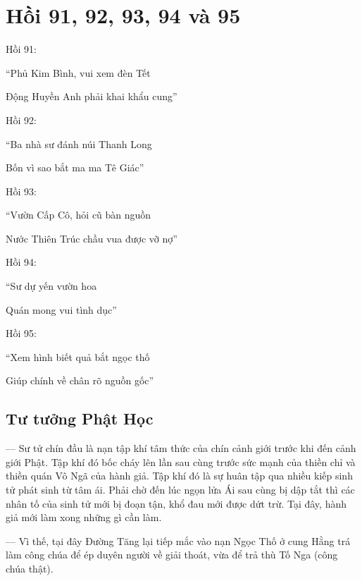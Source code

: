 \chapter{Hồi 91, 92, 93, 94 và 95} %
\label{cha:hoi_91_92_95}

Hồi 91:

\begin{itshape}
``Phủ Kim Bình, vui xem đèn Tết

Động Huyền Anh phải khai khẩu cung''
\end{itshape}

Hồi 92:

\begin{itshape}
``Ba nhà sư đánh núi Thanh Long

Bốn vì sao bắt ma ma Tê Giác''
\end{itshape}

Hồi 93:

\begin{itshape}
``Vườn Cấp Cô, hỏi cũ bàn nguồn

Nước Thiên Trúc chầu vua được vỡ nợ''
\end{itshape}

Hồi 94:

\begin{itshape}
``Sư dự yến vườn hoa

Quán mong vui tình dục''
\end{itshape}

Hồi 95:

\begin{itshape}
``Xem hình biết quả bắt ngọc thố

Giúp chính về chân rõ nguồn gốc''
\end{itshape}

\section{Tư tưởng Phật Học} %
\label{sec:91_92_95_phat_hoc}

— Sư tử chín đầu là nạn tập khí tâm thức của chín cảnh giới trước khi đến cảnh giới Phật. Tập khí đó bốc cháy lên lần sau cùng trước sức mạnh của thiền chỉ và thiền quán Vô Ngã của hành giả. Tập khí đó là sự huân tập qua nhiều kiếp sinh tử phát sinh từ tâm ái. Phải chờ đến lúc ngọn lửa Ái sau cùng bị dập tắt thì các nhân tố của sinh tử mới bị đoạn tận, khổ đau mới được dứt trừ. Tại đây, hành giả mới làm xong những gì cần làm.

— Vì thế, tại đây Đường Tăng lại tiếp mắc vào nạn Ngọc Thố ở cung Hằng trá làm công chúa để ép duyên người về giải thoát, vừa để trả thù Tố Nga (công chúa thật).

